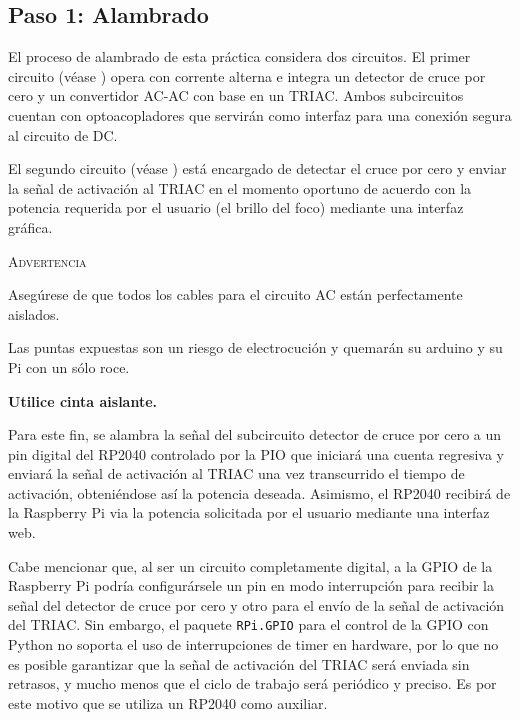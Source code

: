 %
%


\subsection{Paso 1: Alambrado}%
\label{sec:step1}

El proceso de alambrado de esta práctica considera dos circuitos.
El primer circuito (véase ) opera con corrente alterna e integra un detector de cruce por cero y un convertidor AC-AC con base en un TRIAC.
Ambos subcircuitos cuentan con optoacopladores que servirán como interfaz para una conexión segura al circuito de DC.

El segundo circuito (véase ) está encargado de detectar el cruce por cero y enviar la señal de activación al TRIAC en el momento oportuno de acuerdo con la potencia requerida por el usuario (el brillo del foco) mediante una interfaz gráfica.

\medskip
\begin{importantbox}{\large \textsc{Advertencia}}
	\begin{center}
		Asegúrese de que todos los cables para el circuito AC están perfectamente aislados.

		Las puntas expuestas son un riesgo de electrocución y quemarán su arduino y su Pi con un sólo roce.

		\medskip{}

		\textbf{Utilice cinta aislante.}
	\end{center}
\end{importantbox}

Para este fin, se alambra la señal del subcircuito detector de cruce por cero a un pin digital del RP2040 controlado por la PIO que iniciará una cuenta regresiva y enviará la señal de activación al TRIAC una vez transcurrido el tiempo de activación, obteniéndose así la potencia deseada.
Asimismo, el RP2040 recibirá de la Raspberry Pi via \IIC{} la potencia solicitada por el usuario mediante una interfaz web.

Cabe mencionar que, al ser un circuito completamente digital, a la GPIO de la Raspberry Pi podría configurársele un pin en modo interrupción para recibir la señal del detector de cruce por cero y otro para el envío de la señal de activación del TRIAC.
Sin embargo, el paquete \texttt{RPi.GPIO} para el control de la GPIO con Python no soporta el uso de interrupciones de timer en hardware, por lo que no es posible garantizar que la señal de activación del TRIAC será enviada sin retrasos,
y mucho menos que el ciclo de trabajo será periódico y preciso.
Es por este motivo que se utiliza un RP2040 como auxiliar.

